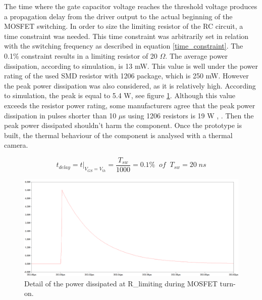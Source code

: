 The time where the gate capacitor voltage reaches the threshold voltage produces a propagation delay from the driver output to the actual beginning of the MOSFET switching. In order to size the limiting resistor of the RC circuit, a time constraint was needed. This time constraint was arbitrarily set in relation with the switching frequency as described in equation \ref{time_constraint}. The 0.1\% constraint results in a limiting resistor of 20 $\Omega$. The average power dissipation, according to simulation, is 13 mW. This value is well under the power rating of the used SMD resistor with 1206 package, which is 250 mW. However the peak power dissipation was also considered, as it is relatively high. According to simulation, the peak is equal to 5.4 W, see figure \ref{gate_resistor_power_dissipation}. Although this value exceeds the resistor power rating, some manufacturers agree that the peak power dissipation in pulses shorter than 10 $\mu$s using 1206 resistors is 19 W \cite{pulse_withstanding_chip_resistors}, \cite{gate_driver_design_infineon}. Then the peak power dissipated shouldn't harm the component. Once the prototype is built, the thermal behaviour of the component is analysed with a thermal camera.

\begin{equation} \label{time_constraint}
t_{delay} = t\big\rvert_{V_{GS} = V_{th}} =\frac{T_{sw}}{1000} = 0.1 \% \;\; of \;\; T_{sw} = 20 \; ns
\end{equation}


\begin{figure}[H]
	\begin{center}
		\includegraphics[width=1.15\textwidth]{../Pictures/P1/Component_sizing/Gate_resistor_power_dissipation.png}
		\caption{Detail of the power dissipated at R\_limiting during MOSFET turn-on.}
		\label{gate_resistor_power_dissipation}
	\end{center}	
\end{figure}
 
